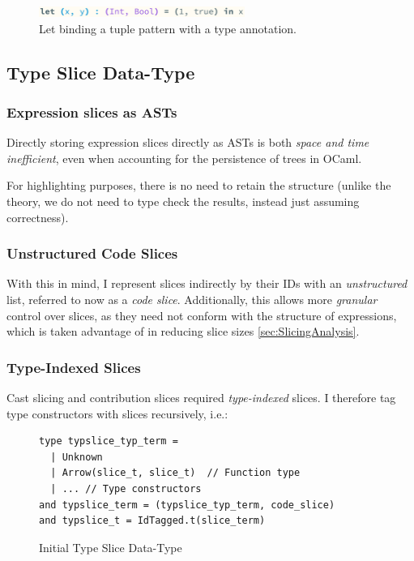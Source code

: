 \begin{figure}[h]
\center\includegraphics[width=0.6\textwidth]{Media/Figures/tuple_term_structure}
\caption{Let binding a tuple pattern with a type annotation.}
\label{fig:tupletermstructure}
\end{figure}
 
\subsection{Type Slice Data-Type}\label{sec:TypeSliceDataType}

\subsubsection{Expression slices as ASTs}

Directly storing expression slices directly as ASTs is both \textit{space and time inefficient}, even when accounting for the persistence \cite[ch. 2]{PurelyFunctionalDataStructures} of trees in OCaml. 

For highlighting purposes, there is no need to retain the structure (unlike the theory, we do not need to type check the results, instead just assuming correctness). 

\subsubsection{Unstructured Code Slices}
\label{sec:UnstructuredSlices}
With this in mind, I represent slices indirectly by their IDs with an \textit{unstructured} list, referred to now as a \textit{code slice}. Additionally, this allows more \textit{granular} control over slices, as they need not conform with the structure of expressions, which is taken advantage of in reducing slice sizes \cref{sec:SlicingAnalysis}.

\subsubsection{Type-Indexed Slices}
Cast slicing and contribution slices required \textit{type-indexed} slices. I therefore tag type constructors with slices recursively, i.e.:

\begin{figure}[h]
\begin{verbatim}
type typslice_typ_term = 
  | Unknown
  | Arrow(slice_t, slice_t)  // Function type
  | ... // Type constructors
and typslice_term = (typslice_typ_term, code_slice)
and typslice_t = IdTagged.t(slice_term)
\end{verbatim}
\caption{Initial Type Slice Data-Type}
\end{figure}

